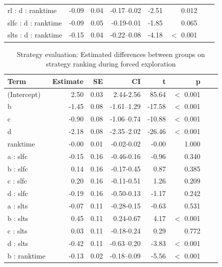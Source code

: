 \documentclass[pdflatex,sn-nature]{sn-jnl}%
\theoremstyle{thmstyleone}%
\theoremstyle{thmstyletwo}%
\theoremstyle{thmstylethree}%
\begin{document}
\begin{appendices}
\begin{table}[p]
\begin{tabular}{lrrrrrrr}
  rl : d : ranktime & -0.09 & 0.04 & -0.17--0.02 & -2.51 &    0.012 \\ 
  slfc : d : ranktime & -0.09 & 0.05 & -0.19-0.01 & -1.85 &    0.065 \\ 
  slts : d : ranktime & -0.15 & 0.04 & -0.22--0.08 & -4.18 &  $<$  0.001 \\ 
   \hline
\end{tabular}
\end{table}


\begin{table}[p]
\caption{Strategy evaluation: Estimated differences between groups on strategy ranking during forced exploration}\label{table_strategyevaluation_diffgroup}
\centering
\begin{tabular}{lrrrrrrr}
  \hline
 Term & Estimate & SE & CI & t & p \\ 
  \hline
 (Intercept) & 2.50 & 0.03 & 2.44-2.56 & 85.64 &  $<$  0.001 \\ 
   b & -1.45 & 0.08 & -1.61--1.29 & -17.58 &  $<$  0.001 \\ 
   c & -0.90 & 0.08 & -1.06--0.74 & -10.88 &  $<$  0.001 \\ 
   d & -2.18 & 0.08 & -2.35--2.02 & -26.46 &  $<$  0.001 \\ 
   ranktime & -0.00 & 0.01 & -0.02-0.02 & -0.00 &    1.000 \\ 
   a : slfc & -0.15 & 0.16 & -0.46-0.16 & -0.96 &    0.340 \\ 
   b : slfc & 0.14 & 0.16 & -0.17-0.45 & 0.87 &    0.385 \\ 
   c : slfc & 0.20 & 0.16 & -0.11-0.51 & 1.26 &    0.209 \\ 
   d : slfc & -0.19 & 0.16 & -0.50-0.13 & -1.17 &    0.242 \\ 
   a : slts & -0.07 & 0.11 & -0.28-0.15 & -0.63 &    0.531 \\ 
   b : slts & 0.45 & 0.11 & 0.24-0.67 & 4.17 &  $<$  0.001 \\ 
   c : slts & 0.03 & 0.11 & -0.18-0.24 & 0.29 &    0.772 \\ 
   d : slts & -0.42 & 0.11 & -0.63--0.20 & -3.83 &  $<$  0.001 \\ 
   b : ranktime & -0.13 & 0.02 & -0.18--0.09 & -5.56 &  $<$  0.001 \\ 

\end{tabular}
\end{table}
\end{appendices}
\end{document}
